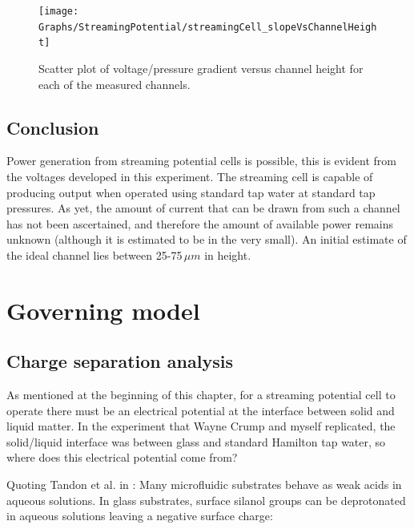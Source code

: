 \begin{figure}
\begin{centering}
\texttt{[image: Graphs/StreamingPotential/streamingCell\_slopeVsChannelHeight]}
\par\end{centering}

\protect\caption{\label{fig:streamingCell_scatter_voltGradVsHeight}Scatter plot of
voltage/pressure gradient versus channel height for each of the measured
channels.}


\end{figure}



\subsection{Conclusion}

Power generation from streaming potential cells is possible, this
is evident from the voltages developed in this experiment. The streaming
cell is capable of producing output when operated using standard tap
water at standard tap pressures. As yet, the amount of current that
can be drawn from such a channel has not been ascertained, and therefore
the amount of available power remains unknown (although it is estimated
to be in the very small). An initial estimate of the ideal channel
lies between 25-75$\,\mu m$ in height.


\section{Governing model}


\subsection{Charge separation analysis}

As mentioned at the beginning of this chapter, for a streaming potential
cell to operate there must be an electrical potential at the interface
between solid and liquid matter. In the experiment that Wayne Crump
and myself replicated, the solid/liquid interface was between glass
and standard Hamilton tap water, so where does this electrical potential
come from?

Quoting Tandon et al. in \cite{Tandon2008}: Many microfluidic substrates
behave as weak acids in aqueous solutions. In glass substrates, surface
silanol groups can be deprotonated in aqueous solutions leaving a
negative surface charge:

